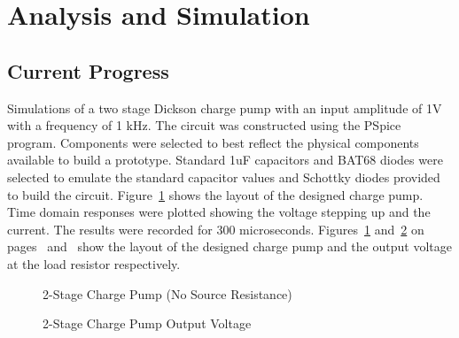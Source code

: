 \documentclass[12pt]{article}
\begin{document}
	\section{Analysis and Simulation}
	
	\subsection{Current Progress}
	Simulations of a two stage Dickson charge pump with an input amplitude of 1V with a frequency of 1 kHz. The circuit was constructed using the PSpice program. Components were selected to best reflect the physical components available to build a prototype. Standard 1uF capacitors and BAT68 diodes were selected to emulate the standard capacitor values and Schottky diodes provided to build the circuit. Figure~\ref{fig:2SCP NSR} shows the layout of the designed charge pump. Time domain responses were plotted showing the voltage stepping up and the current. The results were recorded for 300 microseconds. Figures~\ref{fig:2SCP NSR} and~\ref{fig:2SCP NSR Out} on pages~\pageref{fig:2SCP NSR} and~\pageref{fig:2SCP NSR Out}  show the layout of the designed charge pump and the output voltage at the load resistor respectively.
	
\vspace{0.5em}
\begin{figure}[H]
\caption{2-Stage Charge Pump (No Source Resistance)}
\label{fig:2SCP NSR}
\end{figure}

\vspace{0.5em}
\begin{figure}[H]
\caption{2-Stage Charge Pump Output Voltage}
\label{fig:2SCP NSR Out}
\end{figure}
\end{document}

